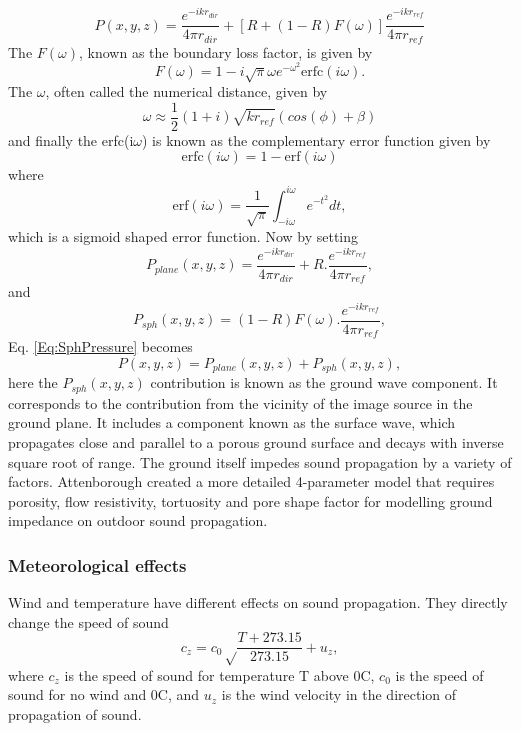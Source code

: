 \begin{equation}
    P(x,y,z)=\frac{e^{-ikr_{dir}}}{4\pi r_{dir}} + [R + (1-R)F(\omega)]\frac{e^{-ikr_{ref}}}{4\pi r_{ref}}
    \label{Eq:SphPressure}
\end{equation}
The $F(\omega)$, known as the boundary loss factor, is given by
\begin{equation}
    F(\omega)=1-i\sqrt{\pi}\omega e^{-\omega^2}\text{erfc}(i\omega).
\end{equation}
The $\omega$, often called the numerical distance, given by
\begin{equation}
    \omega \approx \frac{1}{2}(1+i)\sqrt{kr_{ref}}(cos(\phi)+\beta)
\end{equation}
and finally the erfc(i$\omega$) is known as the complementary error function given by 
\begin{equation}
    \text{erfc}(i\omega) = 1-\text{erf}(i\omega)
\end{equation}
where
\begin{equation}
    \text{erf}(i\omega)=\frac{1}{\sqrt\pi}\int_{-i\omega}^{i\omega}e^{-t^2}dt,
\end{equation}
which is a sigmoid shaped error function. Now by setting
\begin{equation}
    P_{plane}(x,y,z)=\frac{e^{-ikr_{dir}}}{4\pi r_{dir}} + R.\frac{e^{-ikr_{ref}}}{4\pi r_{ref}},
\end{equation}
and 
\begin{equation}
    P_{sph}(x,y,z)=(1-R)F(\omega).\frac{e^{-ikr_{ref}}}{4\pi r_{ref}},
\end{equation}
Eq. \ref{Eq:SphPressure} becomes
\begin{equation}
    P(x,y,z)=P_{plane}(x,y,z) + P_{sph}(x,y,z),
\end{equation}
here the $P_{sph}(x,y,z)$ contribution is known as the ground wave component. It corresponds to the contribution from the vicinity of the image source in the ground plane. It includes a component known as the surface wave, which propagates close and parallel to a porous ground surface and decays with inverse square root of range.
The ground itself impedes sound propagation by a variety of factors. Attenborough \cite{attenborough2011outdoor} created a more detailed 4-parameter model that requires porosity, flow resistivity, tortuosity and pore shape factor for modelling ground impedance on outdoor sound propagation. 
\subsubsection{Meteorological effects}
Wind and temperature have different effects on sound propagation. They directly change the speed of sound
\begin{equation}
    c_z = c_0\sqrt\frac{T+273.15}{273.15} + u_z,
\end{equation}
where $c_z$ is the speed of sound for temperature T above 0\degree C, $c_0$ is the speed of sound for no wind and 0\degree C, and $u_z$ is the wind velocity in the direction of propagation of sound. 

